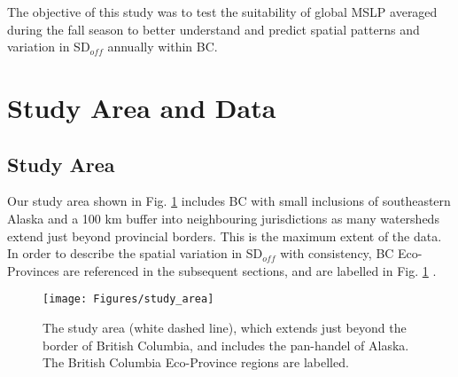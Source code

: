 \documentclass{tATO2e}
\newcommand{\sdoff}{SD$_{off}$}
\begin{document}
\par
The objective of this study was to test the suitability of global MSLP averaged during the fall season to better understand and predict spatial patterns and variation in \sdoff{} annually within BC. 


\section{Study Area and Data}

\subsection{Study Area}
Our study area shown in Fig. \ref{study-area} includes BC with small inclusions of southeastern Alaska and a
100 km buffer into neighbouring jurisdictions as many watersheds extend just beyond provincial borders. This is the maximum extent of the \cite{Bevington2019} data.  In order to describe the spatial variation in \sdoff{} with consistency, BC Eco-Provinces are referenced in the subsequent sections, and are labelled in Fig. \ref{study-area} \citep{BCEcoProv}.

\begin{figure}
	\begin{center}
		\texttt{[image: Figures/study\_area]}
		\caption{The study area (white dashed line), which extends just beyond the border of British Columbia, and includes the pan-handel of Alaska. The British Columbia Eco-Province regions are labelled.}
		\label{study-area}
	\end{center}
\end{figure}
\end{document}
